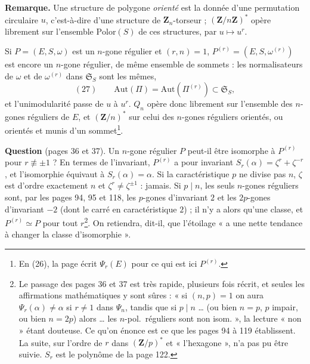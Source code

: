 \documentclass[11pt,a4paper]{article}
\begin{document}
\textbf{Remarque.} Une structure de polygone \emph{orienté} est la donnée d'une
permutation circulaire $u$, c'est-à-dire d'une structure de
$\mathbf{Z}_n$-torseur ; $(\mathbf{Z}/n\mathbf{Z})^{*}$ opère librement sur
l'ensemble $\mathrm{Polor}(S)$ de ces structures, par $u \mapsto u^r$.

Si $P = (E, S, \omega)$ est un $n$-gone régulier et $(r, n) = 1$,
$P^{(r)} = (E, S, \omega^{(r)})$ est encore un $n$-gone régulier, de même
ensemble de sommets : les normalisateurs de $\omega$ et de $\omega^{(r)}$ dans
$\mathfrak{S}_S$ sont les mêmes,
\[
  (27) \qquad \mathrm{Aut}(\Pi) = \mathrm{Aut}(\Pi^{(r)}) \subset
  \mathfrak{S}_S ,
\]
et l'unimodularité passe de $u$ à $u^r$. $Q_n$ opère donc librement sur
l'ensemble des $n$-gones réguliers de $E$, et $(\mathbf{Z}/n)^{*}$ sur celui
des $n$-gones réguliers orientés, ou orientés et munis d'un
sommet\footnote{En (26), la page écrit $\Psi_r(E)$ pour ce qui est ici
$P^{(r)}$.}.

\textbf{Question} (pages 36 et 37). Un $n$-gone régulier $P$ peut-il être
isomorphe à $P^{(r)}$ pour $r \not\equiv \pm 1$ ? En termes de l'invariant,
$P^{(r)}$ a pour invariant $S_r(\alpha) = \zeta^r + \zeta^{-r}$, et
l'isomorphie équivaut à $S_r(\alpha) = \alpha$. Si la caractéristique $p$ ne
divise pas $n$, $\zeta$ est d'ordre exactement $n$ et $\zeta^r \neq
\zeta^{\pm 1}$ : jamais. Si $p \mid n$, les seuls $n$-gones réguliers sont,
par les pages 94, 95 et 118, les $p$-gones d'invariant $2$ et les
$2p$-gones d'invariant $-2$ (dont le carré en caractéristique $2$) ; il n'y a
alors qu'une classe, et $P^{(r)} \simeq P$ pour tout $r$\footnote{Le passage
des pages 36 et 37 est très rapide, plusieurs fois récrit, et seules les
affirmations mathématiques y sont sûres : « si $(n, p) = 1$ on aura
$\Psi_r(\alpha) \neq \alpha$ si $r \neq 1$ dans $\Psi_n$, tandis que si $p
\mid n$ \ldots{} (ou bien $n = p$, $p$ impair, ou bien $n = 2p$) alors
\ldots{} les $n$-pol.\ réguliers sont non isom. », la lecture « non »
étant douteuse. Ce qu'on énonce est ce que les pages 94 à 119 établissent. La
suite, sur l'ordre de $r$ dans $(\mathbf{Z}/p)^{*}$ et « l'hexagone », n'a pas
pu être suivie. $S_r$ est le polynôme de la page 122.}. On retiendra, dit-il,
que l'étoilage « a une nette tendance à changer la classe d'isomorphie ».
\end{document}
